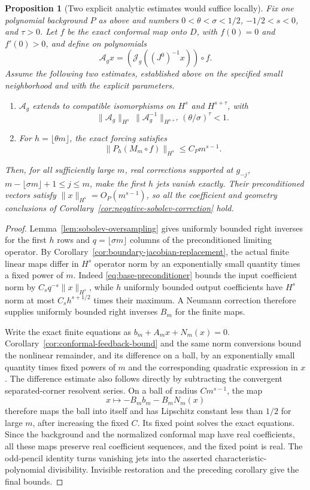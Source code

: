 \documentclass[11pt]{article}
\newtheorem{proposition}{Proposition}[section]
\begin{document}
\begin{proposition}[Two explicit analytic estimates would suffice locally]
\label{prop:sobolev-completion-reduction}
Fix one polynomial background $P$ as above and numbers
$0<\theta<\sigma<1/2$, $-1/2<s<0$, and $\tau>0$.
Let $f$ be the exact conformal map onto $D$, with $f(0)=0$ and
$f'(0)>0$, and define on polynomials
\[
 \mathcal A_gx=(\mathcal J_g((J^0)^{-1}x))\circ f.
\]
Assume the following two estimates, established above on the
specified small neighborhood and with the explicit parameters.
\begin{enumerate}
\item $\mathcal A_g$ extends to compatible isomorphisms on $H^s$
and $H^{s+\tau}$, with
\[
 \|\mathcal A_g\|_{H^s}\,
 \|\mathcal A_g^{-1}\|_{H^{s+\tau}}
            (\theta/\sigma)^\tau<1.
\]
\item For $h=\lfloor\theta m\rfloor$, the exact forcing satisfies
\[
 \|P_h(M_m\circ f)\|_{H^s}\le C_Pm^{s-1}.
\]
\end{enumerate}
Then, for all sufficiently large $m$, real corrections supported at
$g_{-j}$, $m-\lfloor\sigma m\rfloor+1\le j\le m$, make the first
$h$ jets vanish exactly. Their preconditioned vectors satisfy
$\|x\|_{H^s}=O_P(m^{s-1})$, so all the coefficient and geometry
conclusions of Corollary~\ref{cor:negative-sobolev-correction} hold.
\end{proposition}
\begin{proof}
Lemma~\ref{lem:sobolev-oversampling} gives uniformly bounded right
inverses for the first $h$ rows and $q=\lfloor\sigma m\rfloor$
columns of the preconditioned limiting operator. By
Corollary~\ref{cor:boundary-jacobian-replacement}, the actual finite
linear maps differ in $H^s$ operator norm by an exponentially small
quantity times a fixed power of $m$. Indeed
\eqref{eq:base-preconditioner} bounds the input coefficient norm by
$C_sq^{-s}\|x\|_{H^s}$, while $h$ uniformly bounded output
coefficients have $H^s$ norm at most $C_sh^{s+1/2}$ times their
maximum. A Neumann correction therefore supplies uniformly bounded
right inverses $B_m$ for the finite maps.

Write the exact finite equations as $b_m+A_mx+N_m(x)=0$.
Corollary~\ref{cor:conformal-feedback-bound} and the same norm
conversions bound the nonlinear remainder, and its difference on
a ball, by an exponentially small quantity times fixed powers of
$m$ and the corresponding quadratic expression in $x$. The
difference estimate also follows directly by subtracting the
convergent separated-corner resolvent series. On a ball of radius
$C m^{s-1}$, the map
\[
 x\longmapsto-B_mb_m-B_mN_m(x)
\]
therefore maps the ball into itself and has Lipschitz constant less
than $1/2$ for large $m$, after increasing the fixed $C$.
Its fixed point solves the exact equations. Since the background
and the normalized conformal map have real coefficients, all these
maps preserve real coefficient sequences, and the fixed point is real.
The odd-pencil identity turns vanishing jets into the asserted
characteristic-polynomial divisibility. Invisible restoration and
the preceding corollary give the final bounds.
\end{proof}
\end{document}
